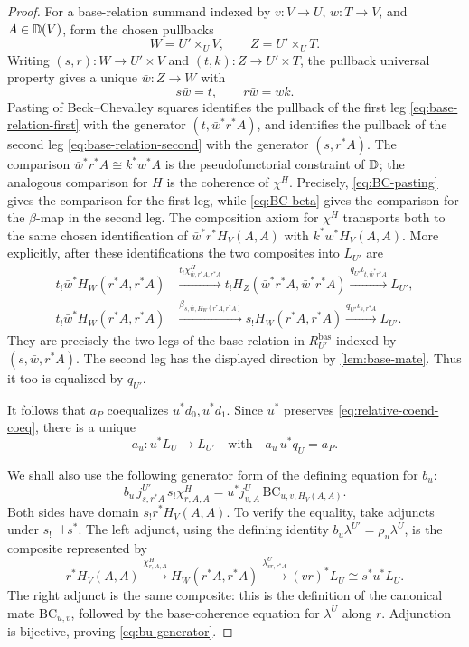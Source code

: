 \begin{proof}
For a base-relation summand indexed by
\(v:V\to U\), \(w:T\to V\), and \(A\in\mathbb{D}(V)\), form the chosen pullbacks
\[
  W=U'\times_UV,
  \qquad
  Z=U'\times_UT.
\]
Writing \((s,r):W\to U'\times V\) and
\((t,k):Z\to U'\times T\), the pullback universal property gives a unique
\(\bar w:Z\to W\) with
\[
  s\bar w=t,
  \qquad
  r\bar w=wk.
\]
Pasting of Beck--Chevalley squares identifies the pullback of the first leg
\cref{eq:base-relation-first} with the generator
\((t,\bar w^*r^*A)\), and identifies the pullback of the second leg
\cref{eq:base-relation-second} with the generator \((s,r^*A)\).  The
comparison
\(\bar w^*r^*A\cong k^*w^*A\) is the pseudofunctorial constraint of
\(\mathbb{D}\); the analogous comparison for \(H\) is the coherence of \(\chi^H\).
Precisely, \cref{eq:BC-pasting} gives the comparison for the first leg,
while \cref{eq:BC-beta} gives the comparison for the \(\beta\)-map in the
second leg.  The composition axiom for \(\chi^H\) transports both to the
same chosen identification of
\(\bar w^*r^*H_V(A,A)\) with \(k^*w^*H_V(A,A)\).
More explicitly, after these identifications the two composites into
\(L_{U'}\) are
\begin{align*}
  t_!\bar w^*H_W(r^*A,r^*A)
  &\xrightarrow{t_!\chi^H_{\bar w,r^*A,r^*A}}
  t_!H_Z(\bar w^*r^*A,\bar w^*r^*A)
  \xrightarrow{q_{U'}\iota_{t,\bar w^*r^*A}}L_{U'},\\
  t_!\bar w^*H_W(r^*A,r^*A)
  &\xrightarrow{\beta_{s,\bar w,H_W(r^*A,r^*A)}}
  s_!H_W(r^*A,r^*A)
  \xrightarrow{q_{U'}\iota_{s,r^*A}}L_{U'}.
\end{align*}
They are precisely the two legs of the base relation in
\(R_{U'}^{\mathrm{bas}}\) indexed by \((s,\bar w,r^*A)\).  The second leg
has the displayed direction by \cref{lem:base-mate}.  Thus it too is
equalized by \(q_{U'}\).

It follows that \(a_P\) coequalizes \(u^*d_0,u^*d_1\).  Since \(u^*\)
preserves \cref{eq:relative-coend-coeq}, there is a unique
\begin{equation}
  a_u:u^*L_U\longrightarrow L_{U'}
  \quad\text{with}\quad
  a_u\,u^*q_U=a_P.
  \label{eq:au}
\end{equation}

We shall also use the following generator form of the defining equation for
\(b_u\):
\begin{equation}
  b_u\,j^{U'}_{s,r^*A}\,s_!\chi^H_{r,A,A}
  =
  u^*j^U_{v,A}\,\mathrm{BC}_{u,v,H_V(A,A)}.
  \label{eq:bu-generator}
\end{equation}
Both sides have domain \(s_!r^*H_V(A,A)\).  To verify the equality, take
adjuncts under \(s_!\dashv s^*\).  The left adjunct, using the defining
identity \(b_u\lambda^{U'}=\rho_u\lambda^U\), is the composite represented
by
\[
  r^*H_V(A,A)\xrightarrow{\chi^H_{r,A,A}}
  H_W(r^*A,r^*A)\xrightarrow{\lambda^U_{vr,r^*A}}
  (vr)^*L_U\cong s^*u^*L_U.
\]
The right adjunct is the same composite: this is the definition of the
canonical mate \(\mathrm{BC}_{u,v}\), followed by the base-coherence
equation for \(\lambda^U\) along \(r\).  Adjunction is bijective, proving
\cref{eq:bu-generator}.


\end{proof}

